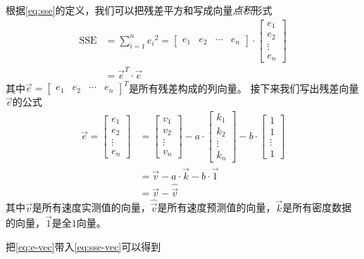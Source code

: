 根据\cref{eq:sse}的定义，我们可以把残差平方和写成向量\emph{点积}形式
\begin{equation}\label{eq:sse-vec}
    \begin{split}
        \text{SSE}&=\sum_{i=1}^n {e_i}^2=
        \begin{bmatrix}
            e_1 & e_2 &\cdots & e_n
        \end{bmatrix}
        \cdot
        \begin{bmatrix}
            e_1 \\
            e_2 \\
            \vdots\\
            e_n
        \end{bmatrix}\\
        &=\vec{e}^T\cdot\vec{e}
    \end{split}
\end{equation}
其中$\vec{e}=[\begin{smallmatrix}
    e_1 & e_2 & \cdots & e_n
\end{smallmatrix}]^T$是所有残差构成的列向量。
接下来我们写出残差向量$\vec{e}$的公式
\begin{equation}\label{eq:e-vec}
    \begin{split}
        \vec{e}=
        \begin{bmatrix}
            e_1 \\
            e_2 \\
            \vdots\\
            e_n
        \end{bmatrix}&=
        \begin{bmatrix}
            v_1 \\
            v_2 \\
            \vdots\\
            v_n
        \end{bmatrix}-
        a\cdot
        \begin{bmatrix}
            k_1 \\
            k_2 \\
            \vdots\\
            k_n
        \end{bmatrix}-
        b\cdot
        \begin{bmatrix}
            1 \\
            1 \\
            \vdots\\
            1
        \end{bmatrix}\\
        &=\vec{v}-a\cdot\vec{k}-b\cdot\vec{1}\\
        &=\vec{v}-\hat{\vec{v}}
    \end{split}
\end{equation}
其中$\vec{v}$是所有速度实测值的向量，$\hat{\vec{v}}$是所有速度预测值的向量，$\vec{k}$是所有密度数据的向量，$\vec{1}$是全$1$向量。

把\cref{eq:e-vec}带入\cref{eq:sse-vec}可以得到
\begin{equation}
\end{equation}